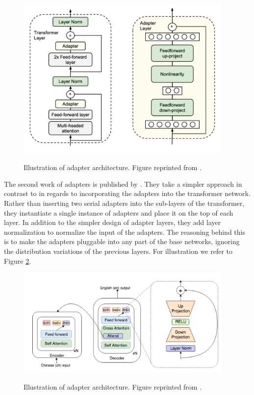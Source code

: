 \begin{figure}[h]
    {\includegraphics[width=0.95\textwidth]{img/adapter_houlsby.png}}
    \centering
    \caption{Illustration of adapter architecture. Figure reprinted from \cite{houlsby2019parameter}.}
    \label{img:ada_houlsby}
\end{figure}

The second work of adapters is published by \cite{bapna2019simple}. They take a simpler approach in contrast to \cite{houlsby2019parameter} in regards to incorporating the adapters into the transformer network. Rather than inserting two serial adapters into the sub-layers of the transformer, they instantiate a single instance of adapters and place it on the top of each layer. In addition to the simpler design of adapter layers, they add layer normalization to normalize the input of the adapters. The reasoning behind this is to make the adapters pluggable into any part of the base networks, ignoring the distribution variations of the previous layers. For illustration we refer to Figure \ref{img:ada_bapna}.

\begin{figure}[h]
    {\includegraphics[width=0.95\textwidth]{img/adapter_bapna.png}}
    \centering
    \caption{Illustration of adapter architecture. Figure reprinted from \cite{bapna2019simple}.}
    \label{img:ada_bapna}
\end{figure}

